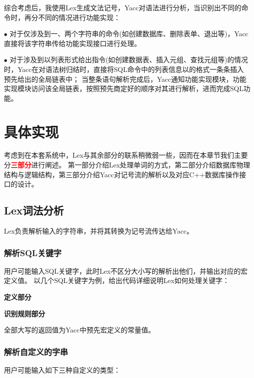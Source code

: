 \documentclass{article}
\begin{document}
\begin{spacing}{2}
    综合考虑后，我使用Lex生成文法记号，Yacc对语法进行分析，当识别出不同的命令时，再分不同的情况进行功能实现：

    \indent \space \space $\bullet$ 对于仅涉及到一、两个字符串的命令(如创建数据库、删除表单、退出等)，Yacc直接将该字符串传给功能实现接口进行处理。

    \indent \space \space $\bullet$ 对于涉及到以列表形式给出指令(如创建数据表、插入元组、查找元组等)的情况时，Yacc在对语法树归结时，直接将SQL命令中的列表信息以的格式一条条插入预先给出的全局链表中；
    当整条语句解析完成后，Yacc通知功能实现模块，功能实现模块访问该全局链表，按照预先商定好的顺序对其进行解析，进而完成SQL功能。

\section{具体实现}
    考虑到在本套系统中，Lex与其余部分的联系稍微弱一些，因而在本章节我们主要分\textbf{\textcolor{red}{三部分}}进行阐述。
    第一部分介绍Lex处理单词的方式，第二部分介绍数据库物理结构与逻辑结构，第三部分介绍Yacc对记号流的解析以及对应C++数据库操作接口的设计。
    \subsection{Lex词法分析}
        Lex负责解析输入的字符串，并将其转换为记号流传达给Yacc。
        \subsubsection{解析SQL关键字}
            用户可能输入SQL关键字，此时Lex不区分大小写的解析出他们，并输出对应的宏定义值。
            以几个SQL关键字为例，给出代码详细说明Lex如何处理关键字：

            \textbf{定义部分}
                \begin{spacing}{1.15}
                
                \end{spacing}
            
            \textbf{识别规则部分} 
            
                全部大写的返回值为Yacc中预先宏定义的常量值。
                \begin{spacing}{1.15}
                
                \end{spacing}

        \subsubsection{解析自定义的字串}
            用户可能输入如下三种自定义的类型：


\end{spacing}
\end{document}

